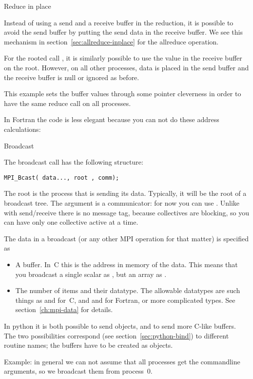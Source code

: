  {Reduce in place}

Instead of using a send and a receive buffer in the reduction, it is
possible to avoid the send buffer by putting the send data in the
receive buffer. We see this mechanism
in section~\ref{sec:allreduce-inplace} for the allreduce operation.

For the rooted call , it is similarly
possible to use the value in the receive buffer on the root.
However, on all other processes, data is placed in the send buffer and
the receive buffer is null or ignored as before.

This example sets the buffer values through some pointer cleverness in
order to have the same reduce call on all processes.
%

In Fortran the code is less elegant because you can not do
these address calculations:
%

 {Broadcast}
\label{sec:bcast}

The broadcast call has the following structure:
\begin{lstlisting}
MPI_Bcast( data..., root , comm);
\end{lstlisting}
The root is the process that is sending its data.
Typically, it will be the root of a broadcast tree.
The  argument is a communicator:
for now you can use .
Unlike with send/receive there is no message tag,
because collectives are blocking, so you can have only one collective active at a
time. 

The data in a broadcast (or any other MPI operation for that matter)
is specified as
\begin{itemize}
\item A buffer. In~C this is the address in memory of the data. This means
  that you broadcast a single scalar as ,
  but an array as .
\item The number of items and their datatype. The allowable datatypes
  are such things as  and  for~C, and
   and  for Fortran, or more complicated types.
  See section~\ref{ch:mpi-data} for details.
\end{itemize}
\begin{pythonnote}
  In python it is both possible to send objects, and to send more
  C-like buffers. The two possibilities correspond (see
  section~\ref{sec:python-bind}) to different routine names; the
  buffers have to be created as  objects.
\end{pythonnote}
%
Example: in general we can not assume that all processes get the
commandline arguments, so we broadcast them from process~0.

